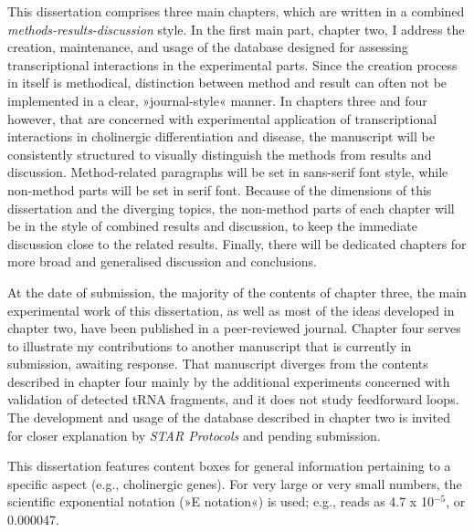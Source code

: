 
This dissertation comprises three main chapters, which are written in a combined \emph{methods-results-discussion} style. In the first main part, chapter two, I address the creation, maintenance, and usage of the database designed for assessing transcriptional interactions in the experimental parts. Since the creation process in itself is methodical, distinction between method and result can often not be implemented in a clear, »journal-style« manner. In chapters three and four however, that are concerned with experimental application of transcriptional interactions in cholinergic differentiation and disease, the manuscript will be consistently structured to visually distinguish the methods from results and discussion. Method-related paragraphs will be set in sans-serif font style, while non-method parts will be set in serif font. Because of the dimensions of this dissertation and the diverging topics, the non-method parts of each chapter will be in the style of combined results and discussion, to keep the immediate discussion close to the related results. Finally, there will be dedicated chapters for more broad and generalised discussion and conclusions.

At the date of submission, the majority of the contents of chapter three, the main experimental work of this dissertation, as well as most of the ideas developed in chapter two, have been published in a peer-reviewed journal.\cite{Lobentanzer2019a} Chapter four serves to illustrate my contributions to another manuscript that is currently in submission, awaiting response.\cite{Winek2020} That manuscript diverges from the contents described in chapter four mainly by the additional experiments concerned with validation of detected tRNA fragments, and it does not study feedforward loops. The development and usage of the database described in chapter two is invited for closer explanation by \emph{STAR Protocols} and pending submission.\cite{Lobentanzer2020}

This dissertation features content boxes for general information pertaining to a specific aspect (e.g., cholinergic genes). For very large or very small numbers, the scientific exponential notation (»E notation«) is used; e.g.,  reads as 4.7 x 10$^{-5}$, or 0.000047.

\newpage
